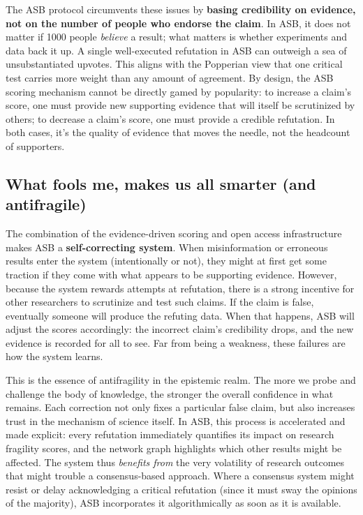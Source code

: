 \documentclass{article}
\begin{document}
The ASB protocol circumvents these issues by \textbf{basing credibility on evidence, not on the number of people who endorse the claim}. In ASB, it does not matter if 1000 people \emph{believe} a result; what matters is whether experiments and data back it up. A single well-executed refutation in ASB can outweigh a sea of unsubstantiated upvotes. This aligns with the Popperian view that one critical test carries more weight than any amount of agreement. By design, the ASB scoring mechanism cannot be directly gamed by popularity: to increase a claim's score, one must provide new supporting evidence that will itself be scrutinized by others; to decrease a claim's score, one must provide a credible refutation. In both cases, it's the quality of evidence that moves the needle, not the headcount of supporters.

\subsection{What fools me, makes us all smarter (and antifragile)}
The combination of the evidence-driven scoring and open access infrastructure makes ASB a \textbf{self-correcting system}. When misinformation or erroneous results enter the system (intentionally or not), they might at first get some traction if they come with what appears to be supporting evidence. However, because the system rewards attempts at refutation, there is a strong incentive for other researchers to scrutinize and test such claims. If the claim is false, eventually someone will produce the refuting data. When that happens, ASB will adjust the scores accordingly: the incorrect claim's credibility drops, and the new evidence is recorded for all to see. Far from being a weakness, these failures are how the system learns.

This is the essence of antifragility in the epistemic realm. The more we probe and challenge the body of knowledge, the stronger the overall confidence in what remains. Each correction not only fixes a particular false claim, but also increases trust in the mechanism of science itself. In ASB, this process is accelerated and made explicit: every refutation immediately quantifies its impact on research fragility scores, and the network graph highlights which other results might be affected. The system thus \emph{benefits from} the very volatility of research outcomes that might trouble a consensus-based approach. Where a consensus system might resist or delay acknowledging a critical refutation (since it must sway the opinions of the majority), ASB incorporates it algorithmically as soon as it is available.
\end{document}
